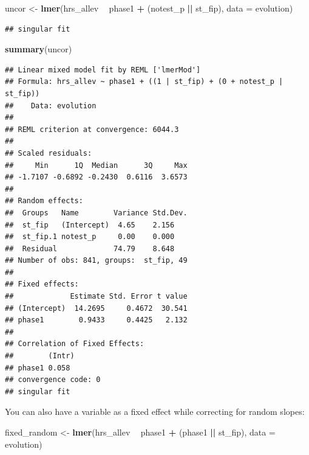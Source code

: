 \documentclass[]{book}
\newenvironment{Shaded}{\begin{snugshade}}{\end{snugshade}}
\newcommand{\KeywordTok}[1]{\textcolor[rgb]{0.13,0.29,0.53}{\textbf{#1}}}
\newcommand{\DataTypeTok}[1]{\textcolor[rgb]{0.13,0.29,0.53}{#1}}
\newcommand{\StringTok}[1]{\textcolor[rgb]{0.31,0.60,0.02}{#1}}
\newcommand{\OperatorTok}[1]{\textcolor[rgb]{0.81,0.36,0.00}{\textbf{#1}}}
\newcommand{\NormalTok}[1]{#1}
\begin{document}
\begin{Shaded}
\begin{Highlighting}[]
\NormalTok{uncor <-}\StringTok{ }\KeywordTok{lmer}\NormalTok{(hrs_allev }\OperatorTok{~}\StringTok{ }\NormalTok{phase1 }\OperatorTok{+}\StringTok{ }\NormalTok{(notest_p }\OperatorTok{||}\StringTok{ }\NormalTok{st_fip), }\DataTypeTok{data =}\NormalTok{ evolution)}
\end{Highlighting}
\end{Shaded}

\begin{verbatim}
## singular fit
\end{verbatim}

\begin{Shaded}
\begin{Highlighting}[]
\KeywordTok{summary}\NormalTok{(uncor)}
\end{Highlighting}
\end{Shaded}

\begin{verbatim}
## Linear mixed model fit by REML ['lmerMod']
## Formula: hrs_allev ~ phase1 + ((1 | st_fip) + (0 + notest_p | st_fip))
##    Data: evolution
## 
## REML criterion at convergence: 6044.3
## 
## Scaled residuals: 
##     Min      1Q  Median      3Q     Max 
## -1.7107 -0.6892 -0.2430  0.6116  3.6573 
## 
## Random effects:
##  Groups   Name        Variance Std.Dev.
##  st_fip   (Intercept)  4.65    2.156   
##  st_fip.1 notest_p     0.00    0.000   
##  Residual             74.79    8.648   
## Number of obs: 841, groups:  st_fip, 49
## 
## Fixed effects:
##             Estimate Std. Error t value
## (Intercept)  14.2695     0.4672  30.541
## phase1        0.9433     0.4425   2.132
## 
## Correlation of Fixed Effects:
##        (Intr)
## phase1 0.058 
## convergence code: 0
## singular fit
\end{verbatim}

You can also have a variable as a fixed effect while correcting for
random slopes:

\begin{Shaded}
\begin{Highlighting}[]
\NormalTok{fixed_random <-}\StringTok{ }\KeywordTok{lmer}\NormalTok{(hrs_allev }\OperatorTok{~}\StringTok{ }\NormalTok{phase1 }\OperatorTok{+}\StringTok{ }\NormalTok{(phase1 }\OperatorTok{||}\StringTok{ }\NormalTok{st_fip), }\DataTypeTok{data =}\NormalTok{ evolution)}
\end{Highlighting}
\end{Shaded}
\end{document}
